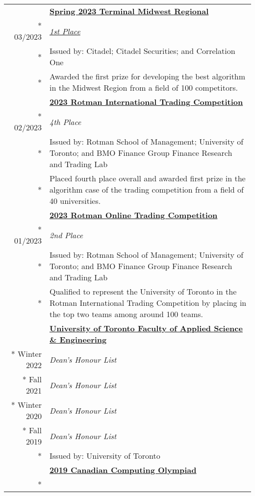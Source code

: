 \documentclass{article}
\begin{document}
	\begin{tabularx}{\textwidth}{r X}
		& \textbf{\href{https://terminal.c1games.com/}{Spring 2023 Terminal Midwest Regional}} \\*
		03/2023 & \textit{\href{https://www.credential.net/950d22c3-1b72-45d8-bf12-732c7ff54927}{1st Place}} \\*
		& {\small Issued by: Citadel; Citadel Securities; and Correlation One} \\*
		& {\small Awarded the first prize for developing the best algorithm in the Midwest Region from a field of 100 competitors.} \\
		\addlinespace
		& \textbf{\href{https://ritc.rotman.utoronto.ca/}{2023 Rotman International Trading Competition}} \\*
		02/2023 & \textit{4th Place} \\*
		& {\small Issued by: Rotman School of Management; University of Toronto; and BMO Finance Group Finance Research and Trading Lab} \\*
		& {\small Placed fourth place overall and awarded first prize in the algorithm case of the trading competition from a field of 40 universities.} \\
		\iftoggle{verbose}{
			\addlinespace
			& \textbf{\href{https://inside.rotman.utoronto.ca/financelab/}{2023 Rotman Online Trading Competition}} \\*
			01/2023 & \textit{2nd Place} \\*
			& {\small Issued by: Rotman School of Management; University of Toronto; and BMO Finance Group Finance Research and Trading Lab} \\*
			& {\small Qualified to represent the University of Toronto in the Rotman International Trading Competition by placing in the top two teams among around 100 teams.} \\
			\addlinespace
			& \textbf{\href{https://engsci.utoronto.ca/}{University of Toronto Faculty of Applied Science \& Engineering}} \\*
			Winter 2022 & \textit{Dean's Honour List} \\*
			Fall 2021 & \textit{Dean's Honour List} \\*
			Winter 2020 & \textit{Dean's Honour List} \\*
			Fall 2019 & \textit{Dean's Honour List} \\*
			& {\small Issued by: University of Toronto} \\
		}{}
		\addlinespace
		& \textbf{\href{https://www.cemc.uwaterloo.ca/contests/ccc-cco.html}{2019 Canadian Computing Olympiad}} \\*

\end{tabularx}
\end{document}

